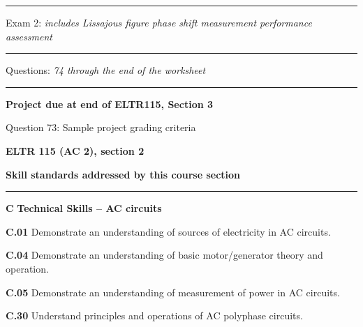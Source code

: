 

\vskip 10pt
\hrule \vskip 5pt
\noindent
{}

\hskip 10pt Exam 2: {\it includes Lissajous figure phase shift measurement performance assessment}
 
\vskip 10pt
\hrule \vskip 5pt
\noindent
{}

\hskip 10pt Questions: {\it 74 through the end of the worksheet}
 
\vskip 10pt
\hrule \vskip 5pt
\noindent
{}

\hskip 10pt {\bf Project due at end of ELTR115, Section 3}
 
\hskip 10pt Question 73: Sample project grading criteria
 
\vskip 10pt











\vfil \eject

\centerline{\bf ELTR 115 (AC 2), section 2} \bigskip 
 
\vskip 10pt

\noindent
{\bf Skill standards addressed by this course section}

\vskip 5pt

\hrule \vskip 10pt
\noindent
{}

\vskip 5pt

\medskip
\item{\bf C} {\bf Technical Skills -- AC circuits}
\item{\bf C.01} Demonstrate an understanding of sources of electricity in AC circuits.
\item{\bf C.04} Demonstrate an understanding of basic motor/generator theory and operation.
\item{\bf C.05} Demonstrate an understanding of measurement of power in AC circuits.
\item{\bf C.30} Understand principles and operations of AC polyphase circuits.
\medskip

